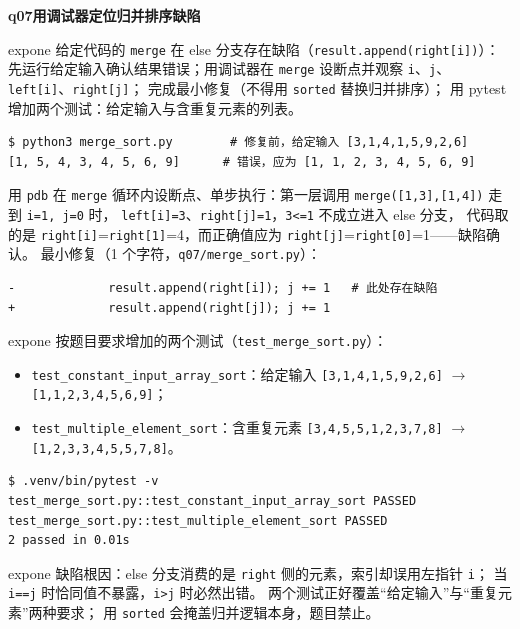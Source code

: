 \documentclass[11pt,a4paper,fontset=none]{ctexart}
\newcommand{\hwbanner}[3]{%
  \par\vspace{1.1em}
  \begin{tcolorbox}[enhanced, colback=#1!8, colframe=#1!75!black,
    boxrule=0.8pt, arc=2pt, left=7pt, right=7pt, top=4pt, bottom=4pt,
    before skip=1.1em]
    {\bfseries\color{#1!75!black}#2\qquad #3}
  \end{tcolorbox}
  \par\vspace{0.1em}\noindent\ignorespaces
}
\newcommand{\sublabel}[2]{%
  \par\vspace{0.8em}\noindent{\bfseries\color{#1!75!black}#2}\par\nobreak\vspace{0.25em}\noindent\ignorespaces
}
\begin{document}
\hwbanner{expone}{q07}{用调试器定位归并排序缺陷}
\begin{reqbox}{expone}
  给定代码的 \texttt{merge} 在 else 分支存在缺陷（\texttt{result.append(right[i])}）：
  先运行给定输入确认结果错误；用调试器在 \texttt{merge} 设断点并观察
  \texttt{i}、\texttt{j}、\texttt{left[i]}、\texttt{right[j]}；
  完成最小修复（不得用 \texttt{sorted} 替换归并排序）；
  用 pytest 增加两个测试：给定输入与含重复元素的列表。
\end{reqbox}
\sublabel{expone}{\faBolt\ 确认缺陷}
\begin{lstlisting}[style=output]
$ python3 merge_sort.py        # 修复前，给定输入 [3,1,4,1,5,9,2,6]
[1, 5, 4, 3, 4, 5, 6, 9]      # 错误，应为 [1, 1, 2, 3, 4, 5, 6, 9]
\end{lstlisting}
\sublabel{expone}{\faBug\ 调试定位与最小修复}
用 \texttt{pdb} 在 \texttt{merge} 循环内设断点、单步执行：第一层调用
\texttt{merge([1,3],[1,4])} 走到 \texttt{i=1, j=0} 时，
\texttt{left[i]=3}、\texttt{right[j]=1}，\texttt{3<=1} 不成立进入 else 分支，
代码取的是 \texttt{right[i]}=\texttt{right[1]}=4，而正确值应为
\texttt{right[j]}=\texttt{right[0]}=1——缺陷确认。
最小修复（1 个字符，\texttt{q07/merge\_sort.py}）：
\begin{lstlisting}[style=shell]
-             result.append(right[i]); j += 1   # 此处存在缺陷
+             result.append(right[j]); j += 1
\end{lstlisting}
\begin{resbox}{expone}
按题目要求增加的两个测试（\texttt{test\_merge\_sort.py}）：
\begin{itemize}[leftmargin=1.4em, itemsep=1pt]
  \item \texttt{test\_constant\_input\_array\_sort}：给定输入
        \texttt{[3,1,4,1,5,9,2,6]} $\rightarrow$ \texttt{[1,1,2,3,4,5,6,9]}；
  \item \texttt{test\_multiple\_element\_sort}：含重复元素
        \texttt{[3,4,5,5,1,2,3,7,8]} $\rightarrow$ \texttt{[1,2,3,3,4,5,5,7,8]}。
\end{itemize}
\begin{lstlisting}[style=output]
$ .venv/bin/pytest -v
test_merge_sort.py::test_constant_input_array_sort PASSED
test_merge_sort.py::test_multiple_element_sort PASSED
2 passed in 0.01s
\end{lstlisting}
\end{resbox}
\begin{trapbox}{expone}
  缺陷根因：else 分支消费的是 \texttt{right} 侧的元素，索引却误用左指针 \texttt{i}；
  当 \texttt{i==j} 时恰同值不暴露，\texttt{i>j} 时必然出错。
  两个测试正好覆盖“给定输入”与“重复元素”两种要求；
  用 \texttt{sorted} 会掩盖归并逻辑本身，题目禁止。
\end{trapbox}
\end{document}
